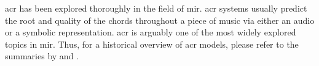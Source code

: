 

\gls{acr} has been explored thoroughly in the field of
\gls{mir}. \gls{acr} systems usually predict the root and
quality of the chords throughout a piece of music via either
an audio or a symbolic representation. \gls{acr} is arguably
one of the most widely explored topics in \gls{mir}. Thus,
for a historical overview of \gls{acr} models, please refer
to the summaries by \textcite{pauwels201920} and
\textcite{ju2021addressing}.
